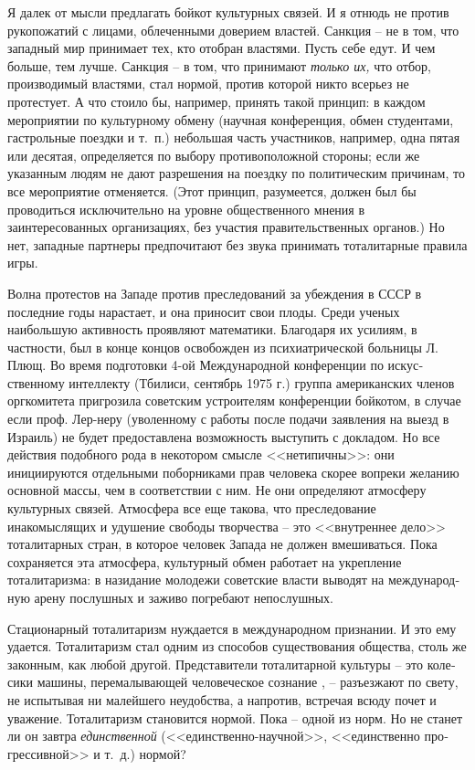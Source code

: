 \documentclass{book}
\begin{document}
Я далек от мысли предлагать бойкот культурных связей. И я отнюдь не против рукопожатий с лицами, облеченными доверием властей. Санкция -- не в том, что западный мир прини­мает тех, кто отобран властями. Пусть себе едут. И чем боль­ше, тем лучше. Санкция -- в том, что принимают \textit{только их,} что отбор, производимый властями, стал нормой, против кото­рой никто всерьез не протестует. А что стоило бы, например, принять такой принцип: в каждом мероприятии по культур­ному обмену (научная конференция, обмен студентами, га­строльные поездки и т.~п.) небольшая часть участников, напри­мер, одна пятая или десятая, определяется по выбору проти­воположной стороны; если же указанным людям не дают раз­решения на поездку по политическим причинам, то все меро­приятие отменяется. (Этот принцип, разумеется, должен был бы проводиться исключительно на уровне общественного мне­ния в заинтересованных организациях, без участия правитель­ственных органов.) Но нет, западные партнеры предпочитают без звука принимать тоталитарные 
правила 
игры.

Волна протестов на Западе против преследований за убеж­дения в СССР в последние годы нарастает, и она приносит свои плоды. Среди ученых наибольшую активность проявляют мате­матики. Благодаря их усилиям, в частности, был в конце кон­цов освобожден из психиатрической больницы Л. Плющ. Во время подготовки 4-ой Международной конференции по искус­ственному интеллекту (Тбилиси, сентябрь 1975 г.) группа американских членов оргкомитета пригрозила советским уст­роителям конференции бойкотом, в случае если проф. Лер-неру (уволенному с работы после подачи заявления на выезд в Израиль) не будет предоставлена возможность выступить с докладом. Но все действия подобного рода в некотором смыс­ле <<нетипичны>>: они инициируются отдельными поборниками прав человека скорее вопреки желанию основной массы, чем в соответствии с ним. Не они определяют атмосферу культур­ных связей. Атмосфера все еще такова, что преследование инакомыслящих и удушение свободы творчества -- это <<внут­реннее дело>> тоталитарных стран, в которое 
человек 
Запада не должен вмешиваться. Пока сохраняется эта атмосфера, культурный обмен работает на укрепление тоталитаризма: в назидание молодежи советские власти выводят на международ­ную арену послушных и заживо погребают непослушных.

Стационарный тоталитаризм нуждается в международном признании. И это ему удается. Тоталитаризм стал одним из спо­собов существования общества, столь же законным, как лю­бой другой. Представители тоталитарной культуры -- это коле­сики машины, перемалывающей человеческое сознание , -- разъез­жают по свету, не испытывая ни малейшего неудобства, а на­против, встречая всюду почет и уважение. Тоталитаризм стано­вится нормой. Пока -- одной из норм. Но не станет ли он завт­ра \textit{единственной}  (<<единственно-научной>>, <<единственно про­грессивной>> и т.~д.) нормой?
\end{document}
